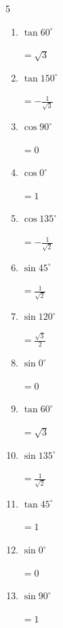\begin{multicols}{5}
\begin{enumerate}
  \item $\displaystyle \tan{60^\circ}$

        $\displaystyle =\sqrt{3}$

  \item $\displaystyle \tan{150^\circ}$

        $\displaystyle =-\frac{1}{\sqrt{3}}$

\columnbreak %

  \item $\displaystyle \cos{90^\circ}$

        $\displaystyle =0$

  \item $\displaystyle \cos{0^\circ}$

        $\displaystyle =1$

  \item $\displaystyle \cos{135^\circ}$

        $\displaystyle =-\frac{1}{\sqrt{2}}$

  \item $\displaystyle \sin{45^\circ}$

        $\displaystyle =\frac{1}{\sqrt{2}}$

  \item $\displaystyle \sin{120^\circ}$

        $\displaystyle =\frac{\sqrt{3}}{2}$

  \item $\displaystyle \sin{0^\circ}$

        $\displaystyle =0$

  \item $\displaystyle \tan{60^\circ}$

        $\displaystyle =\sqrt{3}$

  \item $\displaystyle \sin{135^\circ}$

        $\displaystyle =\frac{1}{\sqrt{2}}$

  \item $\displaystyle \tan{45^\circ}$

        $\displaystyle =1$

  \item $\displaystyle \sin{0^\circ}$

        $\displaystyle =0$

  \item $\displaystyle \sin{90^\circ}$

        $\displaystyle =1$


\end{enumerate}
\end{multicols}
